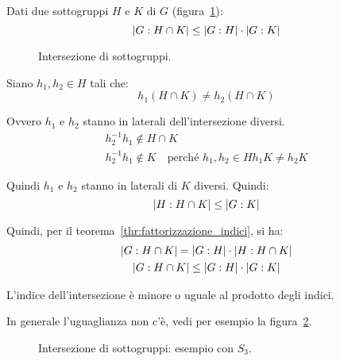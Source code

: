 \begin{esercizio}
	Dati due sottogruppi $H$ e $K$ di $G$ (figura~\ref{fig:Laterali_intersezione_di_sottogruppi}):
	\begin{equation*}
		\lvert G:H \cap K \rvert \le \lvert G:H \rvert \cdot \lvert G:K \rvert
	\end{equation*}
\end{esercizio}
\begin{figure}[tp]
	\centering
	\caption{Intersezione di sottogruppi.}
	\label{fig:Laterali_intersezione_di_sottogruppi}
\end{figure}
\begin{soluzione}
	Siano $h_1, h_2 \in H$ tali che:
	\begin{equation*}
		h_1(H \cap K) \ne h_2(H \cap K)
	\end{equation*}

	Ovvero $h_1$ e $h_2$ stanno in laterali dell'intersezione diversi.
	\begin{gather*}
		h_2^{-1}h_1 \not\in H \cap K \\
		h_2^{-1}h_1 \not\in K \quad \text{perché } h_1, h_2 \in H
		h_1 K \ne h_2 K
	\end{gather*}

	Quindi $h_1$ e $h_2$ stanno in laterali di $K$ diversi. Quindi:
	\begin{equation*}
		\lvert H:H \cap K \rvert \le \lvert G:K \rvert
	\end{equation*}

	Quindi, per il teorema~\ref{thr:fattorizzazione_indici}, si ha:
	\begin{gather*}
		\lvert G:H \cap K \rvert = \lvert G:H \rvert \cdot \lvert H:H \cap K \rvert \\
		\lvert G:H \cap K \rvert \le \lvert G:H \rvert \cdot \lvert G:K \rvert
	\end{gather*}

	L'indice dell'intersezione è minore o uguale al prodotto degli indici.
\end{soluzione}

In generale l'uguaglianza non c'è, vedi per esempio la figura~\ref{fig:Laterali_intersezione_di_sottogruppi_esempio_s3}.

\begin{figure}[tp]
	\centering
	\caption{Intersezione di sottogruppi: esempio con $S_3$.}
	\label{fig:Laterali_intersezione_di_sottogruppi_esempio_s3}
\end{figure}

